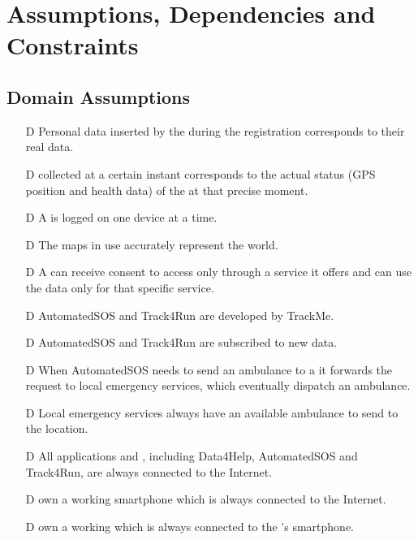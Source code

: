 \documentclass[../../rasd.tex]{subfiles}
\begin{document}
\section{Assumptions, Dependencies and Constraints}
		\subsection{Domain Assumptions}
			 	\begin{itemize}
				 	\item[D\subs{1}]Personal data inserted by the  during the registration corresponds to their real data.
					\item[D\subs{2}] collected at a certain instant corresponds to the actual status (GPS position and health data) of the  at that precise moment.				
					\item[D\subs{3}]A  is logged on one device at a time.
					\item[D\subs{4}]The maps in use accurately represent the world.
					\item[D\subs{5}]A  can receive consent to  access only through a service it offers and can use the data only for that specific service.
					\item[D\subs{6}]AutomatedSOS and Track4Run are  developed by TrackMe.
					\item[D\subs{7}]AutomatedSOS and Track4Run are subscribed to new data.
					\item[D\subs{8}]When AutomatedSOS needs to send an ambulance to a  it forwards the request to local emergency services, which eventually dispatch an ambulance.
					\item[D\subs{9}]Local emergency services always have an available ambulance to send to the  location.
					\item[D\subs{10}]All applications and , including Data4Help, AutomatedSOS and Track4Run, are always connected to the Internet.
					\item[D\subs{11}] own a working smartphone which is always connected to the Internet.
					\item[D\subs{12}] own a working  which is always connected to the 's smartphone.



				\end{itemize}		
\end{document}
